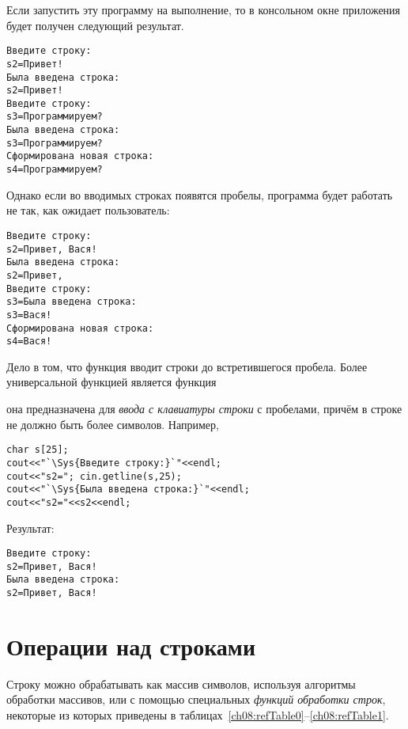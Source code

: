 Если запустить эту программу на выполнение, то в консольном окне приложения будет получен следующий результат.
\begin{verbatim}
Введите строку:
s2=Привет!
Была введена строка:
s2=Привет!
Введите строку:
s3=Программируем?
Была введена строка:
s3=Программируем?
Сформирована новая строка:
s4=Программируем?
\end{verbatim}
Однако если во вводимых строках появятся пробелы, программа будет работать не так, как ожидает пользователь:
\begin{verbatim}
Введите строку:
s2=Привет, Вася!
Была введена строка:
s2=Привет,
Введите строку:
s3=Была введена строка:
s3=Вася!
Сформирована новая строка:
s4=Вася!
\end{verbatim}
Дело в том, что функция  вводит строки до встретившегося пробела. Более универсальной функцией
является функция


она предназначена для \emph{ввода с клавиатуры строки}  с пробелами,
причём в строке не должно быть более  символов. Например,
\begin{lstlisting}
char s[25];
cout<<"`\Sys{Введите строку:}`"<<endl;
cout<<"s2="; cin.getline(s,25);
cout<<"`\Sys{Была введена строка:}`"<<endl;
cout<<"s2="<<s2<<endl;
\end{lstlisting}

Результат:
\begin{verbatim}
Введите строку:
s2=Привет, Вася!
Была введена строка:
s2=Привет, Вася!
\end{verbatim}

\section[Операции над строками]{Операции над строками}\label{ch08:2}
Строку можно обрабатывать как массив символов, используя алгоритмы обработки массивов, или с помощью специальных
\emph{функций обработки строк},
некоторые из которых приведены в таблицах~\ref{ch08:refTable0}--\ref{ch08:refTable1}. 

